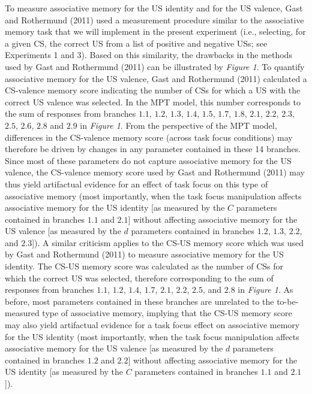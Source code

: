 \documentclass[
  doc,floatsintext]{apa6}
\begin{document}
To measure associative memory for the US identity and for the US valence, Gast and Rothermund (2011) used a measurement procedure similar to the associative memory task that we will implement in the present experiment (i.e., selecting, for a given CS, the correct US from a list of positive and negative USs; see Experiments 1 and 3).
Based on this similarity, the drawbacks in the methods used by Gast and Rothermund (2011) can be illustrated by \emph{Figure 1}.
To quantify associative memory for the US valence, Gast and Rothermund (2011) calculated a CS-valence memory score indicating the number of CSs for which a US with the correct US valence was selected.
In the MPT model, this number corresponds to the sum of responses from branches \(1.1\), \(1.2\), \(1.3\), \(1.4\), \(1.5\), \(1.7\), \(1.8\), \(2.1\), \(2.2\), \(2.3\), \(2.5\), \(2.6\), \(2.8\) and \(2.9\) in \emph{Figure 1}.
From the perspective of the MPT model, differences in the CS-valence memory score (across task focus conditions) may therefore be driven by changes in any parameter contained in these 14 branches.
Since most of these parameters do not capture associative memory for the US valence, the CS-valence memory score used by Gast and Rothermund (2011) may thus yield artifactual evidence for an effect of task focus on this type of associative memory (most importantly, when the task focus manipulation affects associative memory for the US identity {[}as measured by the \(C\) parameters contained in branches \(1.1\) and \(2.1\){]} without affecting associative memory for the US valence {[}as measured by the \(d\) parameters contained in branches \(1.2\), \(1.3\), \(2.2\), and \(2.3\){]}).
A similar criticism applies to the CS-US memory score which was used by Gast and Rothermund (2011) to measure associative memory for the US identity.
The CS-US memory score was calculated as the number of CSs for which the correct US was selected, therefore corresponding to the sum of responses from branches \(1.1\), \(1.2\), \(1.4\), \(1.7\), \(2.1\), \(2.2\), \(2.5\), and \(2.8\) in \emph{Figure 1}.
As before, most parameters contained in these branches are unrelated to the to-be-measured type of associative memory, implying that the CS-US memory score may also yield artifactual evidence for a task focus effect on associative memory for the US identity (most importantly, when the task focus manipulation affects associative memory for the US valence {[}as measured by the \(d\) parameters contained in branches \(1.2\) and \(2.2\){]} without affecting associative memory for the US identity {[}as measured by the \(C\) parameters contained in branches \(1.1\) and \(2.1\){]}).
\end{document}
